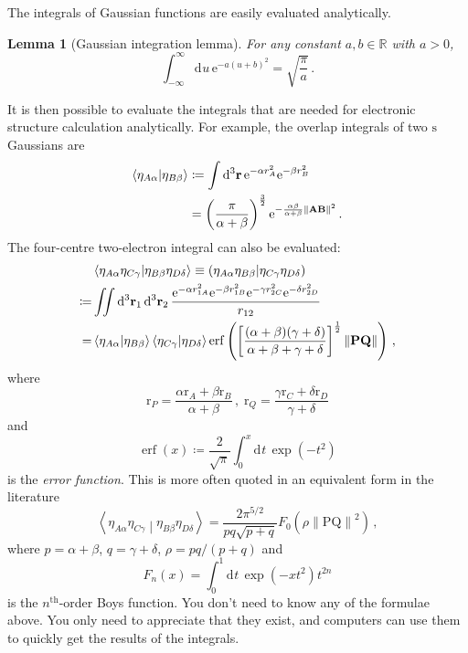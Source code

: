 \documentclass{article}
\theoremstyle{plain}\theoremheaderfont{\normalfont\itshape}\theorembodyfont{\rmfamily}\theoremseparator{.}\newtheorem*{rem}{Remark}\newtheorem*{ex}{Example}\newtheorem*{proof}{Proof}\newtheorem*{altp}{Alternative proof}
\theoremstyle{plain}\theoremheaderfont{\normalfont\bfseries}\theorembodyfont{\rmfamily}\theoremseparator{.}\newtheorem{thm}{Theorem}[section]\newtheorem{lem}[thm]{Lemma}\newtheorem{prop}[thm]{Proposition}\newtheorem*{cor}{Corollary}\newtheorem{defn}[thm]{Definition}\newtheorem{clm}[thm]{Claim}\newtheorem{clminproof}{Claim}
\theoremstyle{break}\theoremheaderfont{\normalfont\itshape}\theorembodyfont{\rmfamily}\theoremseparator{.\medskip}\newtheorem*{proofskip}{Proof}\newtheorem*{exs}{Examples}\newtheorem*{rems}{Remarks}
\theoremstyle{break}\theoremheaderfont{\normalfont\bfseries}\theorembodyfont{\rmfamily}\theoremseparator{.\medskip}\newtheorem{lemskip}[thm]{Lemma}\newtheorem{defnskip}[thm]{Definition}\newtheorem{propskip}[thm]{Proposition}\newtheorem{thmskip}[thm]{Theorem}
\numberwithin{equation}{section}
\newcommand{\e}{\mathrm{e}}
\newcommand{\dd}[2][]{\mathrm{d}^{#1} #2\,}
\newcommand{\braket}[2]{\left\langle #1 \middle| #2 \right\rangle}
\newcommand{\vb}[1]{\bm{\mathrm{#1}}}
\newcommand{\norm}[1]{\left\| #1 \right\|}
\newcommand{\bracket}[2]{\left( #1 \middle| #2 \right)}
\DeclareMathOperator*{\erf}{\operatorname{erf}}
\begin{document}
    The integrals of Gaussian functions are easily evaluated analytically.
    \begin{lem}[Gaussian integration lemma]
		For any constant \(a,b\in\mathbb{R}\) with \(a> 0\),
		\begin{equation}
            \int_{-\infty}^{\infty}\dd{u}\e^{-a(u+b)^2}=\sqrt{\frac{\pi}{a}}\,.
        \end{equation}
	\end{lem}
    It is then possible to evaluate the integrals that are needed for electronic structure calculation analytically. For example, the overlap integrals of two \(\mathrm{s}\) Gaussians are
    \begin{align}
        \braket{\eta_{A\alpha}}{\eta_{B\beta}}&\coloneqq\int\dd[3]{\vb{r}}\e^{-\alpha r_A^2}\e^{-\beta r_B^2}\notag\\
        &=\left(\frac{\pi}{\alpha+\beta}\right)^{\frac{3}{2}}\e^{-\frac{\alpha\beta}{\alpha+\beta}\norm{\vb{AB}}^2}\,.
    \end{align}
    The four-centre two-electron integral can also be evaluated:
    \begin{align}
        &\braket{\eta_{A\alpha}\eta_{C\gamma}}{\eta_{B\beta}\eta_{D\delta}}\equiv \bracket{\eta_{A\alpha}\eta_{B\beta}}{\eta_{C\gamma}\eta_{D\delta}}\notag\\
        \coloneqq&\iint\dd[3]{\vb{r}_1}\dd[3]{\vb{r}_2}\frac{\e^{-\alpha r_{1A}^2}\e^{-\beta r_{1B}^2}\e^{-\gamma r_{2C}^2}\e^{-\delta r_{2D}^2}}{r_{12}}\notag\\
        =&\braket{\eta_{A\alpha}}{\eta_{B\beta}}\braket{\eta_{C\gamma}}{\eta_{D\delta}}\erf\left(\left[\frac{(\alpha+\beta)(\gamma+\delta)}{\alpha+\beta+\gamma+\delta}\right]^{\frac{1}{2}}\norm{\vb{PQ}}\right)\,,
    \end{align}
    where
    \begin{equation}
        \vb{r}_P=\frac{\alpha\vb{r}_A+\beta\vb{r}_B}{\alpha+\beta}\,,\;\vb{r}_Q=\frac{\gamma\vb{r}_C+\delta\vb{r}_D}{\gamma+\delta}
    \end{equation}
    and
    \begin{equation}
        \erf(x)\coloneqq\frac{2}{\sqrt{\pi}}\int_{0}^{x}\dd{t}\exp(-t^2)
    \end{equation}
    is the \textit{error function}. This is more often quoted in an equivalent form in the literature
    \begin{equation}
        \braket{\eta_{A\alpha}\eta_{C\gamma}}{\eta_{B\beta}\eta_{D\delta}}=\frac{2\pi^{5/2}}{pq\sqrt{p+q}}F_0(\rho\norm{\vb{PQ}}^2)\,,
    \end{equation}
    where \(p=\alpha+\beta\), \(q=\gamma+\delta\), \(\rho=pq/(p+q)\) and
    \begin{equation}
        F_n(x)=\int_{0}^{1}\dd{t}\exp(-xt^2)t^{2n}
    \end{equation}
    is the \(n^{\text{th}}\)-order Boys function. You don't need to know any of the formulae above. You only need to appreciate that they exist, and computers can use them to quickly get the results of the integrals.
\end{document}
